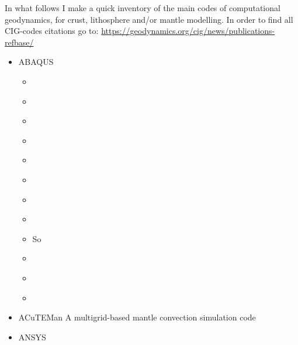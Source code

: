 
In what follows I make a quick inventory of the main codes of computational geodynamics, 
for crust, lithosphere and/or mantle modelling.
In order to find all CIG-codes citations go to: 
\url{https://geodynamics.org/cig/news/publications-refbase/}

\begin{itemize}

\item {\codefont ABAQUS} 

\begin{scriptsize}
\begin{itemize}
\item[\twothousandone] \cite{brry01}
\item[\twothousandtwo] \cite{gedh02}
\item[\twothousandthree] \cite{fumr03}
\item[\twothousandsix] \cite{hapf06}
\item[\twothousandseven] \cite{camg07}
\item[\twothousandnine] \cite{kuhe09}\cite{makh09}
\item[\twothousandten] \cite{camg10}
\item[\twothousandtwelve] \cite{nalr12}
\item[\twothousandthirteen] So \etal \cite{soyl13}
\item[\twothousandfifteen] \cite{pevp15}
\item[\twothousandseventeen] \cite{naam17}
\item[\twothousandeighteen] \cite{naam18}
\end{itemize}
\end{scriptsize}

\item {\codefont ACuTEMan} 
A multigrid-based mantle convection simulation code

\cite{kame05}
\cite{miko15}
\cite{kamo15}

\item {\codefont ANSYS} 


\end{itemize}
